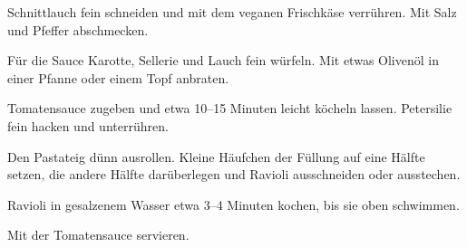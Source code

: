 \begin{recipe}
{    \step%
    Schnittlauch fein schneiden und mit dem veganen Frischkäse verrühren. Mit Salz und Pfeffer abschmecken.
    
    \step%
    Für die Sauce Karotte, Sellerie und Lauch fein würfeln. Mit etwas Olivenöl in einer Pfanne oder einem Topf anbraten.
    
    \step%
    Tomatensauce zugeben und etwa 10--15 Minuten leicht köcheln lassen. Petersilie fein hacken und unterrühren.
    
    \step%
    Den Pastateig dünn ausrollen. Kleine Häufchen der Füllung auf eine Hälfte setzen, die andere Hälfte darüberlegen und Ravioli ausschneiden oder ausstechen.
    
    \step%
    Ravioli in gesalzenem Wasser etwa 3--4 Minuten kochen, bis sie oben schwimmen.
    
    \step%
    Mit der Tomatensauce servieren.
}


\end{recipe}